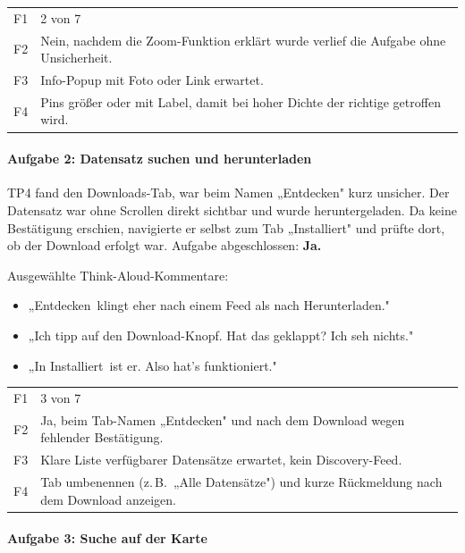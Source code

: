 \documentclass{article}
\begin{document}
\begin{tabular}{@{}lp{10cm}@{}}
  F1 & 2 von 7 \\
  F2 & Nein, nachdem die Zoom-Funktion erklärt wurde verlief die Aufgabe ohne Unsicherheit. \\
  F3 & Info-Popup mit Foto oder Link erwartet. \\
  F4 & Pins größer oder mit Label, damit bei hoher Dichte der richtige
       getroffen wird. \\
\end{tabular}

\paragraph{Aufgabe 2: Datensatz suchen und herunterladen}

TP4 fand den Downloads-Tab, war beim Namen „Entdecken" kurz unsicher.
Der Datensatz war ohne Scrollen direkt sichtbar und wurde heruntergeladen.
Da keine Bestätigung erschien, navigierte er selbst zum Tab „Installiert"
und prüfte dort, ob der Download erfolgt war.
Aufgabe abgeschlossen: \textbf{Ja.}

Ausgewählte Think-Aloud-Kommentare:
\begin{itemize}
  \item „\glqq Entdecken\grqq\ klingt eher nach einem Feed als nach
        Herunterladen."
  \item „Ich tipp auf den Download-Knopf. Hat das geklappt? Ich seh
        nichts."
  \item „In \glqq Installiert\grqq\ ist er. Also hat's funktioniert."
\end{itemize}

\begin{tabular}{@{}lp{10cm}@{}}
  F1 & 3 von 7 \\
  F2 & Ja, beim Tab-Namen „Entdecken" und nach dem Download wegen
       fehlender Bestätigung. \\
  F3 & Klare Liste verfügbarer Datensätze erwartet, kein Discovery-Feed. \\
  F4 & Tab umbenennen (z.\,B.\ „Alle Datensätze") und kurze Rückmeldung
       nach dem Download anzeigen. \\
\end{tabular}

\paragraph{Aufgabe 3: Suche auf der Karte}
\end{document}

